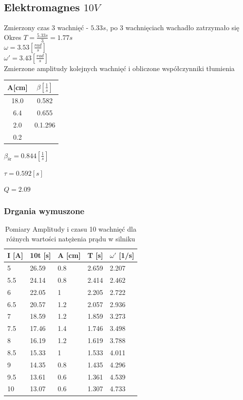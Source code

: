 \documentclass[]{article}
\begin{document}
	\subsection{Elektromagnes $10V$}
	Zmierzony czas 3 wachnięć - $5.33s$, po 3 wachnięciach wachadło zatrzymało się\\
	Okres $T=\frac{5.33s}{3} = 1.77s$\\
	$\omega = 3.53 \left[ \frac{rad}{s}\right]$\\
	$\omega' = 3.43 \left[ \frac{rad}{s}\right]$\\
	Zmierzone amplitudy kolejnych wachnięć i obliczone współczynniki tłumienia
	\begin{table}[h]
		\begin{tabular}{|c|c|}
			\hline 
			A[cm] & $\beta\left[ \frac{1}{s}\right] $ \\ 
			\hline 
			18.0 & 0.582 \\ 
			\hline 
			6.4 & 0.655 \\ 
			\hline 
			2.0 & 0.1.296 \\ 
			\hline 
			0.2 &  \\ 
			\hline 
		\end{tabular} 
	\end{table}
	
	$\beta_{\text{śr}} = 0.844 \left[ \frac{1}{s}\right] $
	
	$\tau=0.592[s]$
	
	$Q = 2.09$
	
	\subsubsection{Drgania wymuszone}
	
	\begin{table}[h]
		\centering
		\caption{Pomiary Amplitudy i czasu 10 wachnięć dla różnych wartości natężenia prądu w silniku}
		\begin{tabular}{|l|l|l|l|l|}
			\hline
			
			I [A] & 10t [s] & A [cm] & T [s] & $\omega'$ [1/s] \\ \hline
			5 & 26.59 & 0.8 & 2.659 & 2.207 \\ \hline
			5.5 & 24.14 & 0.8 & 2.414 & 2.462 \\ \hline
			6 & 22.05 & 1 & 2.205 & 2.722 \\ \hline
			6.5 & 20.57 & 1.2 & 2.057 & 2.936 \\ \hline
			7 & 18.59 & 1.2 & 1.859 & 3.273 \\ \hline
			7.5 & 17.46 & 1.4 & 1.746 & 3.498 \\ \hline
			8 & 16.19 & 1.2 & 1.619 & 3.788 \\ \hline
			8.5 & 15.33 & 1 & 1.533 & 4.011 \\ \hline
			9 & 14.35 & 0.8 & 1.435 & 4.296 \\ \hline
			9.5 & 13.61 & 0.6 & 1.361 & 4.539 \\ \hline
			10 & 13.07 & 0.6 & 1.307 & 4.733 \\ \hline
			
			
		\end{tabular}
	\end{table}
	
\end{document}
